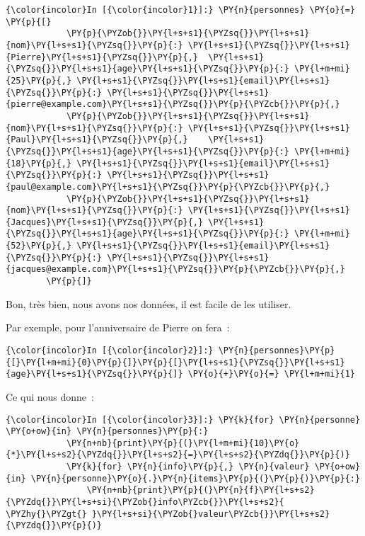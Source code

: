     \begin{Verbatim}[commandchars=\\\{\}]
{\color{incolor}In [{\color{incolor}1}]:} \PY{n}{personnes} \PY{o}{=} \PY{p}{[}
            \PY{p}{\PYZob{}}\PY{l+s+s1}{\PYZsq{}}\PY{l+s+s1}{nom}\PY{l+s+s1}{\PYZsq{}}\PY{p}{:} \PY{l+s+s1}{\PYZsq{}}\PY{l+s+s1}{Pierre}\PY{l+s+s1}{\PYZsq{}}\PY{p}{,}  \PY{l+s+s1}{\PYZsq{}}\PY{l+s+s1}{age}\PY{l+s+s1}{\PYZsq{}}\PY{p}{:} \PY{l+m+mi}{25}\PY{p}{,} \PY{l+s+s1}{\PYZsq{}}\PY{l+s+s1}{email}\PY{l+s+s1}{\PYZsq{}}\PY{p}{:} \PY{l+s+s1}{\PYZsq{}}\PY{l+s+s1}{pierre@example.com}\PY{l+s+s1}{\PYZsq{}}\PY{p}{\PYZcb{}}\PY{p}{,}
            \PY{p}{\PYZob{}}\PY{l+s+s1}{\PYZsq{}}\PY{l+s+s1}{nom}\PY{l+s+s1}{\PYZsq{}}\PY{p}{:} \PY{l+s+s1}{\PYZsq{}}\PY{l+s+s1}{Paul}\PY{l+s+s1}{\PYZsq{}}\PY{p}{,}    \PY{l+s+s1}{\PYZsq{}}\PY{l+s+s1}{age}\PY{l+s+s1}{\PYZsq{}}\PY{p}{:} \PY{l+m+mi}{18}\PY{p}{,} \PY{l+s+s1}{\PYZsq{}}\PY{l+s+s1}{email}\PY{l+s+s1}{\PYZsq{}}\PY{p}{:} \PY{l+s+s1}{\PYZsq{}}\PY{l+s+s1}{paul@example.com}\PY{l+s+s1}{\PYZsq{}}\PY{p}{\PYZcb{}}\PY{p}{,}
            \PY{p}{\PYZob{}}\PY{l+s+s1}{\PYZsq{}}\PY{l+s+s1}{nom}\PY{l+s+s1}{\PYZsq{}}\PY{p}{:} \PY{l+s+s1}{\PYZsq{}}\PY{l+s+s1}{Jacques}\PY{l+s+s1}{\PYZsq{}}\PY{p}{,} \PY{l+s+s1}{\PYZsq{}}\PY{l+s+s1}{age}\PY{l+s+s1}{\PYZsq{}}\PY{p}{:} \PY{l+m+mi}{52}\PY{p}{,} \PY{l+s+s1}{\PYZsq{}}\PY{l+s+s1}{email}\PY{l+s+s1}{\PYZsq{}}\PY{p}{:} \PY{l+s+s1}{\PYZsq{}}\PY{l+s+s1}{jacques@example.com}\PY{l+s+s1}{\PYZsq{}}\PY{p}{\PYZcb{}}\PY{p}{,}
        \PY{p}{]}
\end{Verbatim}


    Bon, très bien, nous avons nos données, il est facile de les utiliser.

Par exemple, pour l'anniversaire de Pierre on fera~:

    \begin{Verbatim}[commandchars=\\\{\}]
{\color{incolor}In [{\color{incolor}2}]:} \PY{n}{personnes}\PY{p}{[}\PY{l+m+mi}{0}\PY{p}{]}\PY{p}{[}\PY{l+s+s1}{\PYZsq{}}\PY{l+s+s1}{age}\PY{l+s+s1}{\PYZsq{}}\PY{p}{]} \PY{o}{+}\PY{o}{=} \PY{l+m+mi}{1}
\end{Verbatim}


    Ce qui nous donne~:

    \begin{Verbatim}[commandchars=\\\{\}]
{\color{incolor}In [{\color{incolor}3}]:} \PY{k}{for} \PY{n}{personne} \PY{o+ow}{in} \PY{n}{personnes}\PY{p}{:}
            \PY{n+nb}{print}\PY{p}{(}\PY{l+m+mi}{10}\PY{o}{*}\PY{l+s+s2}{\PYZdq{}}\PY{l+s+s2}{=}\PY{l+s+s2}{\PYZdq{}}\PY{p}{)}
            \PY{k}{for} \PY{n}{info}\PY{p}{,} \PY{n}{valeur} \PY{o+ow}{in} \PY{n}{personne}\PY{o}{.}\PY{n}{items}\PY{p}{(}\PY{p}{)}\PY{p}{:}
                \PY{n+nb}{print}\PY{p}{(}\PY{n}{f}\PY{l+s+s2}{\PYZdq{}}\PY{l+s+si}{\PYZob{}info\PYZcb{}}\PY{l+s+s2}{ \PYZhy{}\PYZgt{} }\PY{l+s+si}{\PYZob{}valeur\PYZcb{}}\PY{l+s+s2}{\PYZdq{}}\PY{p}{)}
\end{Verbatim}


